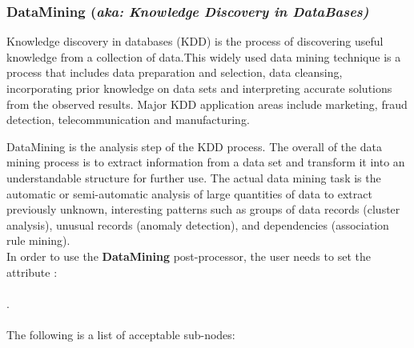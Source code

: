 \subsubsection{DataMining (\textit{aka: Knowledge Discovery in DataBases)}}
\label{subsubsec:DataMining}

Knowledge discovery in databases (KDD) is the process of discovering
 useful knowledge from a collection of data.This widely used data
mining technique is a process that includes data preparation and
selection, data cleansing, incorporating prior knowledge on data
sets and interpreting accurate solutions from the observed results.
Major KDD application areas include marketing, fraud detection,
telecommunication and manufacturing.

DataMining is the analysis step of the KDD process. The overall of
the data mining process is to extract information from a data set
and transform it into an understandable structure for further use.
The actual data mining task is the
automatic or semi-automatic analysis of large quantities of data
to extract previously unknown, interesting patterns such as groups
 of data records (cluster analysis), unusual records (anomaly
detection), and dependencies (association rule mining).
\\
%
In order to use the \textbf{DataMining} post-processor, the user
needs to set the attribute : \\
\\
. \\
\\
The following is a list of acceptable sub-nodes:
